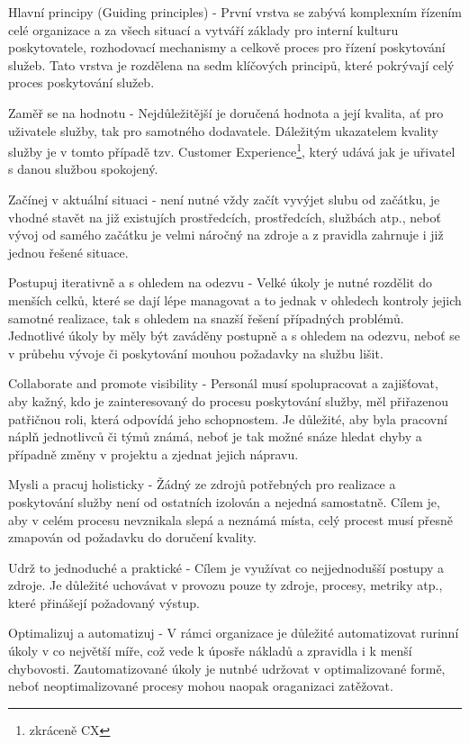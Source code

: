 \documentclass[
  digital,     %
  twoside,     %
  lof,         %
  lot,         %
]{fithesis4}
\begin{document}
\begin{compactitem}
    \item Hlavní principy (Guiding principles) - První vrstva se zabývá komplexním řízením celé organizace a za všech situací a vytváří základy pro interní kulturu poskytovatele, rozhodovací mechanismy a celkově proces pro řízení poskytování služeb. Tato vrstva je rozdělena na sedm klíčových principů, které pokrývají celý proces poskytování služeb. 
    \begin{compactitem}
      \item Zaměř se na hodnotu - Nejdůležitější je doručená hodnota a její kvalita, ať pro uživatele služby, tak pro samotného dodavatele. Dáležitým ukazatelem kvality služby je v tomto případě tzv. Customer Experience\footnote{zkráceně CX}, který udává jak je uřivatel s danou službou spokojený.
      \item Začínej v aktuální situaci - není nutné vždy začít vyvýjet slubu od začátku, je vhodné stavět na již existujích prostředcích, prostředcích, službách atp., neboť vývoj od samého začátku je velmi náročný na zdroje a z pravidla zahrnuje i již jednou řešené situace. 
      \item Postupuj iterativně a s ohledem na odezvu - Velké úkoly je nutné rozdělit do menších celků, které se dají lépe managovat a to jednak v ohledech kontroly jejich samotné realizace, tak s ohledem na snazší řešení případných problémů. Jednotlivé úkoly by měly být zaváděny postupně a s ohledem na odezvu, neboť se v průbehu vývoje či poskytování mouhou požadavky na službu lišit. 
      \item Collaborate and promote visibility - Personál musí spolupracovat a zajišťovat, aby kažný, kdo je zainteresovaný do procesu poskytování služby, měl přiřazenou patřičnou roli, která odpovídá jeho schopnostem. Je důležité, aby byla pracovní náplň jednotlivců či týmů známá, neboť je tak možné snáze hledat chyby a případně změny v projektu a zjednat jejich nápravu.
      \item Mysli a pracuj holisticky - Žádný ze zdrojů potřebných pro realizace a poskytování služby není od ostatních izolován a nejedná samostatně. Cílem je, aby v celém procesu nevznikala slepá a neznámá místa, celý procest musí přesně zmapován od požadavku do doručení kvality.
      \item Udrž to jednoduché a praktické - Cílem je využívat co nejjednodušší postupy a zdroje. Je důležité uchovávat v provozu pouze ty zdroje, procesy, metriky atp., které přinášejí požadovaný výstup. 
      \item Optimalizuj a automatizuj - V rámci organizace je důležité automatizovat rurinní úkoly v co největší míře, což vede k úposře nákladů a zpravidla i k menší chybovosti. Zautomatizované úkoly je nutnbé udržovat v optimalizované formě, neboť neoptimalizované procesy mohou naopak oraganizaci zatěžovat.

\end{compactitem}
\end{compactitem}
\end{document}
